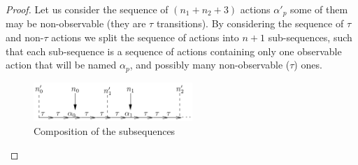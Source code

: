 \documentclass{elsarticle}
\begin{document}
\begin{proof}
Let us consider the sequence of $(n_1+n_2+3)$  actions $\alpha'_p$ some of them may be non-observable (they are $\tau$ transitions). By considering the sequence of $\tau$ and non-$\tau$ actions we split the sequence of actions into $n+1$ sub-sequences, such that each sub-sequence is a sequence of actions containing  only one observable action that will be named $\alpha_p$, and possibly many non-observable ($\tau$) ones. 

\begin{figure}
\begin{center}
\includegraphics[width=6cm]{XFIG/proof-explain}
\end{center}\caption{Composition of the subsequences}\label{figproof}
\end{figure}


\end{proof}
\end{document}

